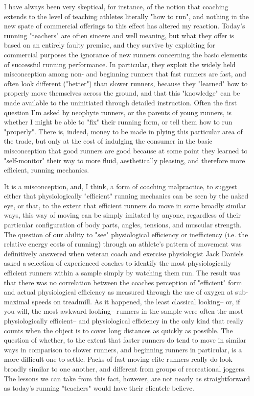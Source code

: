 I have always been very skeptical, for instance, of the notion that coaching extends to the level of teaching athletes literally "how to run", and nothing in the new spate of commercial offerings to this effect has altered my reaction. Today's running "teachers" are often sincere and well meaning, but what they offer is based on an entirely faulty premise, and they survive by exploiting for commercial purposes the ignorance of new runners concerning the basic elements of successful running performance. In particular, they exploit the widely held misconception among non- and beginning runners that fast runners are fast, and often look different ("better") than slower runners, because they "learned" how to properly move themselves across the ground, and that this "knowledge" can be made available to the uninitiated through detailed instruction. Often the first question I'm asked by neophyte runners, or the parents of young runners, is whether I might be able to "fix" their running form, or tell them how to run "properly". There is, indeed, money to be made in plying this particular area of the trade, but only at the cost of indulging the consumer in the basic misconception that good runners are good because at some point they learned to "self-monitor" their way to more fluid, aesthetically pleasing, and therefore more efficient, running mechanics.

It is a misconception, and, I think, a form of coaching malpractice, to suggest either that physiologically "efficient" running mechanics can be seen by the naked eye, or that, to the extent that efficient runners do move in some broadly similar ways, this way of moving can be simply imitated by anyone, regardless of their particular configuration of body parts, angles, tensions, and muscular strength. The question of our ability to "see" physiological efficiency or inefficiency (i.e. the relative energy costs of running) through an athlete's pattern of movement was definitively answered when veteran coach and exercise physiologist Jack Daniels asked a selection of experienced coaches to identify the most physiologically efficient runners within a sample simply by watching them run. The result was that there was no correlation between the coaches perception of "efficient" form and actual physiological efficiency as measured through the use of oxygen at sub-maximal speeds on treadmill. As it happened, the least classical looking-- or, if you will, the most awkward looking-- runners in the sample were often the most physiologically efficient-- and physiological efficiency in the only kind that really counts when the object is to cover long distances as quickly as possible. The question of whether, to the extent that faster runners do tend to move in similar ways in comparison to slower runners, and beginning runners in particular, is a more difficult one to settle. Packs of fast-moving elite runners really do look broadly similar to one another, and different from groups of recreational joggers. The lessons we can take from this fact, however, are not nearly as straightforward as today's running "teachers" would have their clientele believe.

